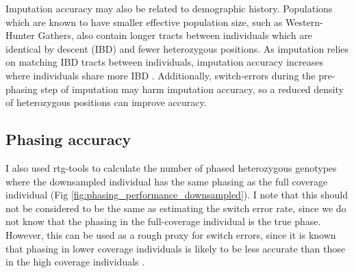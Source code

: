 Imputation accuracy may also be related to demographic history. Populations which are known to have smaller effective population size, such as Western-Hunter Gathers, also contain longer tracts between individuals which are identical by descent (IBD) and fewer heterozygous positions. As imputation relies on matching IBD tracts between individuals, imputation accuracy increases where individuals share more IBD \cite{kong2008detection}. Additionally, switch-errors during the pre-phasing step of imputation may harm imputation accuracy, so a reduced density of heterozygous positions can improve accuracy. 

\subsection{Phasing accuracy}

I also used rtg-tools to calculate the number of phased heterozygous genotypes where the downsampled individual has the same phasing as the full coverage individual (Fig \ref{fig:phasing_performance_downsampled}). I note that this should not be considered to be the same as estimating the switch error rate, since we do not know that the phasing in the full-coverage individual is the true phase. However, this can be used as a rough proxy for switch errors, since it is known that phasing in lower coverage individuals is likely to be less accurate than those in the high coverage individuals \cite{rubinacci2021efficient}.


